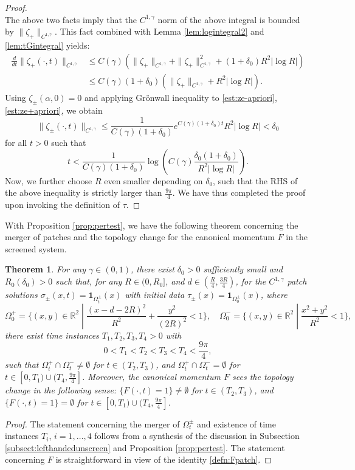 \documentclass[11pt,reqno]{amsproc}
\newtheorem{thm}{Theorem}
\newcommand{\R}{\mathbb{R}}
\newcommand{\ze}{\zeta}
\begin{document}
\begin{proof}
$$    $$
    The above two facts imply that the $C^{1,\gamma}$ norm of the above integral is bounded by $\|\ze_+\|_{C^{1,\gamma}}$. This fact combined with Lemma \ref{lem:logintegral2} and \ref{lem:tGintegral} yields:
    \begin{equation}
        \label{est:ze+apriori}
        \begin{aligned}
        \frac{d}{dt}\|\ze_+(\cdot,t)\|_{C^{1,\gamma}} &\le C(\gamma)\left(\|\ze_+\|_{C^{1,\gamma}} + \|\ze_+\|_{C^{1,\gamma}}^2 + (1+\delta_0)R^2|\log R|\right)\\
        &\le C(\gamma)(1+\delta_0)(\|\ze_+\|_{C^{1,\gamma}} + R^2|\log R|).
        \end{aligned}
    \end{equation}
    Using $\ze_\pm(\alpha,0) = 0$ and applying Gr\"onwall inequality to \eqref{est:ze-apriori}, \eqref{est:ze+apriori}, we obtain
    $$
    \|\ze_\pm(\cdot,t)\|_{C^{1,\gamma}} \le \frac{1}{C(\gamma)(1+\delta_0)}e^{C(\gamma)(1+\delta_0)t} R^2|\log R| < \delta_0
    $$
    for all $t > 0$ such that
    $$
    t < \frac{1}{C(\gamma)(1+\delta_0)}\log\left(C(\gamma) \frac{\delta_0(1+\delta_0)}{R^2|\log R|}\right).
    $$
    Now, we further choose $R$ even smaller depending on $\delta_0$, such that the RHS of the above inequality is strictly larger than $\frac{9\pi}{4}$. We have thus completed the proof upon invoking the definition of $\tau$.
\end{proof}
With Proposition \ref{prop:pertest}, we have the following theorem concerning the merger of patches and the topology change for the canonical momentum $F$ in the screened system.
\begin{thm}
    For any $\gamma \in (0,1)$, there exist $\delta_0 > 0$ sufficiently small and $R_0(\delta_0) > 0$ such 
    that, for any $R \in (0,R_0]$, and $d\in \left(\frac{R}{4}, \frac{3R}{4}\right)$, for the 
    $C^{1,\gamma}$ patch solutions $\sigma_\pm(x,t) = \mathbf{1}_{\Omega_t^\pm}(x)$ with initial data $\tau_\pm(x) = \mathbf{1}_{\Omega_0^\pm}(x)$, where
    $$
    \Omega_0^+ = \{(x,y) \in \R^2\; |\; \frac{(x-d-2R)^2}{R^2} + \frac{y^2}{(2R)^2} < 1\},\quad \Omega_0^- = \{(x,y) \in \R^2\;|\; \frac{x^2 + y^2}{R^2} < 1\}, 
    $$
    there exist time instances $T_1, T_2, T_3, T_4 > 0$ with
$$
0 < T_1 < T_2 < T_3 <  T_4 < \frac{9\pi}{4},
$$
such that $\Omega_t^+ \cap \Omega_t^- \neq \emptyset$ for $t \in (T_2, T_3)$, and $\Omega_t^+ \cap \Omega_t^- = \emptyset$ for $t \in [0,T_1) \cup (T_4,\frac{9\pi}{4}]$. Moreover, the canonical momentum $F$ sees the topology change in the following sense: $\{F(\cdot,t) = 1\} \neq \emptyset$ for $t \in (T_2, T_3)$, and $\{F(\cdot,t) = 1\} = \emptyset$ for $t \in [0,T_1) \cup (T_4,\frac{9\pi}{4}]$.
\end{thm}
\begin{proof}
    The statement concerning the merger of $\Omega_t^\pm$ and existence of time instances $T_i$, $i = 1,\hdots,4$ follows from a synthesis of the discussion in Subsection \ref{subsect:lefthandedunscreen} and Proposition \ref{prop:pertest}. The statement concerning $F$ is straightforward in view of the identity \eqref{defn:Fpatch}.
\end{proof}
\end{document}
